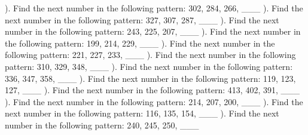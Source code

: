 \documentclass{article}%
\begin{document}
\newline%
). Find the next number in the following pattern: 302, 284, 266, \_\_\_%
\newline%
\newline%
). Find the next number in the following pattern: 327, 307, 287, \_\_\_%
\newline%
\newline%
). Find the next number in the following pattern: 243, 225, 207, \_\_\_%
\newline%
\newline%
). Find the next number in the following pattern: 199, 214, 229, \_\_\_%
\newline%
\newline%
). Find the next number in the following pattern: 221, 227, 233, \_\_\_%
\newline%
\newline%
). Find the next number in the following pattern: 310, 329, 348, \_\_\_%
\newline%
\newline%
). Find the next number in the following pattern: 336, 347, 358, \_\_\_%
\newline%
\newline%
). Find the next number in the following pattern: 119, 123, 127, \_\_\_%
\newline%
\newline%
). Find the next number in the following pattern: 413, 402, 391, \_\_\_%
\newline%
\newline%
). Find the next number in the following pattern: 214, 207, 200, \_\_\_%
\newline%
\newline%
). Find the next number in the following pattern: 116, 135, 154, \_\_\_%
\newline%
\newline%
). Find the next number in the following pattern: 240, 245, 250, \_\_\_%
\end{document}
